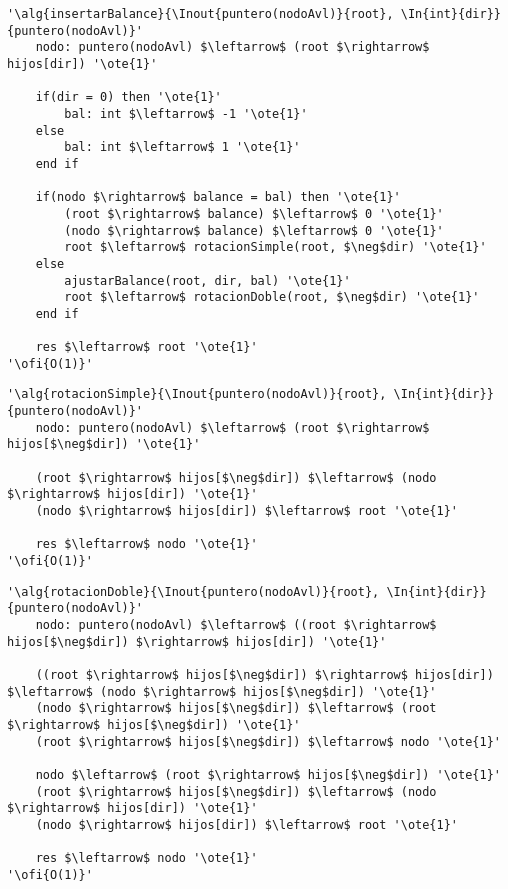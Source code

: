 \begin{lstlisting}[mathescape]
'\alg{insertarBalance}{\Inout{puntero(nodoAvl)}{root}, \In{int}{dir}}{puntero(nodoAvl)}'
	nodo: puntero(nodoAvl) $\leftarrow$ (root $\rightarrow$ hijos[dir]) '\ote{1}'

	if(dir = 0) then '\ote{1}'
		bal: int $\leftarrow$ -1 '\ote{1}'
	else
		bal: int $\leftarrow$ 1 '\ote{1}'
	end if

	if(nodo $\rightarrow$ balance = bal) then '\ote{1}'
		(root $\rightarrow$ balance) $\leftarrow$ 0 '\ote{1}'
		(nodo $\rightarrow$ balance) $\leftarrow$ 0 '\ote{1}'
		root $\leftarrow$ rotacionSimple(root, $\neg$dir) '\ote{1}'
	else
		ajustarBalance(root, dir, bal) '\ote{1}'
		root $\leftarrow$ rotacionDoble(root, $\neg$dir) '\ote{1}'
	end if

	res $\leftarrow$ root '\ote{1}'
'\ofi{O(1)}'
\end{lstlisting}

\begin{lstlisting}[mathescape]
'\alg{rotacionSimple}{\Inout{puntero(nodoAvl)}{root}, \In{int}{dir}}{puntero(nodoAvl)}'
	nodo: puntero(nodoAvl) $\leftarrow$ (root $\rightarrow$ hijos[$\neg$dir]) '\ote{1}'

	(root $\rightarrow$ hijos[$\neg$dir]) $\leftarrow$ (nodo $\rightarrow$ hijos[dir]) '\ote{1}'
	(nodo $\rightarrow$ hijos[dir]) $\leftarrow$ root '\ote{1}'

	res $\leftarrow$ nodo '\ote{1}'
'\ofi{O(1)}'
\end{lstlisting}

\begin{lstlisting}[mathescape]
'\alg{rotacionDoble}{\Inout{puntero(nodoAvl)}{root}, \In{int}{dir}}{puntero(nodoAvl)}'
	nodo: puntero(nodoAvl) $\leftarrow$ ((root $\rightarrow$ hijos[$\neg$dir]) $\rightarrow$ hijos[dir]) '\ote{1}'

	((root $\rightarrow$ hijos[$\neg$dir]) $\rightarrow$ hijos[dir]) $\leftarrow$ (nodo $\rightarrow$ hijos[$\neg$dir]) '\ote{1}'
	(nodo $\rightarrow$ hijos[$\neg$dir]) $\leftarrow$ (root $\rightarrow$ hijos[$\neg$dir]) '\ote{1}'
	(root $\rightarrow$ hijos[$\neg$dir]) $\leftarrow$ nodo '\ote{1}'

	nodo $\leftarrow$ (root $\rightarrow$ hijos[$\neg$dir]) '\ote{1}'
	(root $\rightarrow$ hijos[$\neg$dir]) $\leftarrow$ (nodo $\rightarrow$ hijos[dir]) '\ote{1}'
	(nodo $\rightarrow$ hijos[dir]) $\leftarrow$ root '\ote{1}'

	res $\leftarrow$ nodo '\ote{1}'
'\ofi{O(1)}'
\end{lstlisting}

